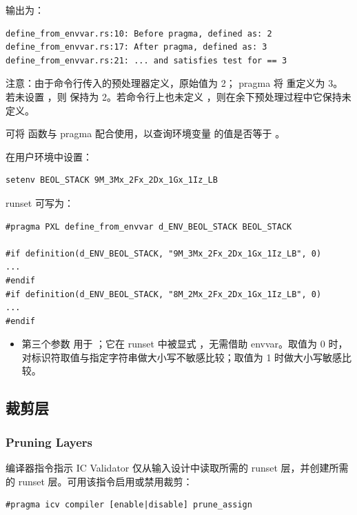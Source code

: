 输出为：
\begin{lstlisting}
define_from_envvar.rs:10: Before pragma, defined as: 2
define_from_envvar.rs:17: After pragma, defined as: 3
define_from_envvar.rs:21: ... and satisfies test for == 3
\end{lstlisting}

注意：由于命令行传入的预处理器定义，原始值为 2； pragma 将  重定义为 3。
若未设置 ，则  保持为 2。若命令行上也未定义 ，则在余下预处理过程中它保持未定义。

可将  函数与  pragma 配合使用，以查询环境变量  的值是否等于 。

在用户环境中设置：
\begin{lstlisting}
setenv BEOL_STACK 9M_3Mx_2Fx_2Dx_1Gx_1Iz_LB
\end{lstlisting}

runset 可写为：
\begin{lstlisting}[style=pxl]
#pragma PXL define_from_envvar d_ENV_BEOL_STACK BEOL_STACK

#if definition(d_ENV_BEOL_STACK, "9M_3Mx_2Fx_2Dx_1Gx_1Iz_LB", 0)
...
#endif
#if definition(d_ENV_BEOL_STACK, "8M_2Mx_2Fx_2Dx_1Gx_1Iz_LB", 0)
...
#endif
\end{lstlisting}

\begin{itemize}
  \item 第三个参数  用于 ；它在 runset 中被显式 ，无需借助 envvar。取值为 0 时，对标识符取值与指定字符串做大小写不敏感比较；取值为 1 时做大小写敏感比较。
\end{itemize}

\subsection{裁剪层}
\subsubsection*{Pruning Layers}

 编译器指令指示 IC Validator 仅从输入设计中读取所需的 runset 层，并创建所需的 runset 层。可用该指令启用或禁用裁剪：
\begin{lstlisting}[style=pxl]
#pragma icv compiler [enable|disable] prune_assign
\end{lstlisting}

